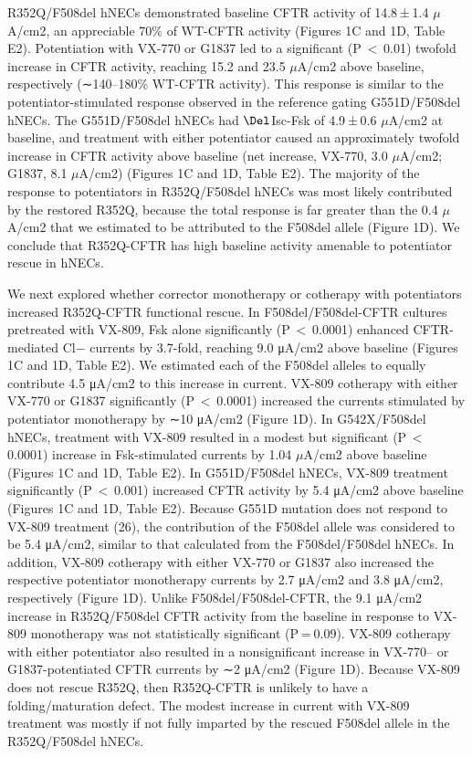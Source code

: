 R352Q/F508del hNECs demonstrated baseline CFTR activity of 14.8 ± 1.4 $\mu$A/cm2, an appreciable 70\% of WT-CFTR activity (Figures 1C and 1D, Table E2). Potentiation with VX-770 or G1837 led to a significant (P $<$ 0.01) twofold increase in CFTR activity, reaching 15.2 and 23.5 $\mu$A/cm2 above baseline, respectively (∼140–180\% WT-CFTR activity). This response is similar to the potentiator-stimulated response observed in the reference gating G551D/F508del hNECs. The G551D/F508del hNECs had $\Del$Isc-Fsk of 4.9 ± 0.6 $\mu$A/cm2 at baseline, and treatment with either potentiator caused an approximately twofold increase in CFTR activity above baseline (net increase, VX-770, 3.0 $\mu$A/cm2; G1837, 8.1 $\mu$A/cm2) (Figures 1C and 1D, Table E2). The majority of the response to potentiators in R352Q/F508del hNECs was most likely contributed by the restored R352Q, because the total response is far greater than the 0.4 $\mu$A/cm2 that we estimated to be attributed to the F508del allele (Figure 1D). We conclude that R352Q-CFTR has high baseline activity amenable to potentiator rescue in hNECs.

We next explored whether corrector monotherapy or cotherapy with potentiators increased R352Q-CFTR functional rescue. In F508del/F508del-CFTR cultures pretreated with VX-809, Fsk alone significantly (P $<$ 0.0001) enhanced CFTR-mediated Cl− currents by 3.7-fold, reaching 9.0 μA/cm2 above baseline (Figures 1C and 1D, Table E2). We estimated each of the F508del alleles to equally contribute 4.5 μA/cm2 to this increase in current. VX-809 cotherapy with either VX-770 or G1837 significantly (P $<$ 0.0001) increased the currents stimulated by potentiator monotherapy by ∼10 μA/cm2 (Figure 1D). In G542X/F508del hNECs, treatment with VX-809 resulted in a modest but significant (P $<$ 0.0001) increase in Fsk-stimulated currents by 1.04 $\mu$A/cm2 above baseline (Figures 1C and 1D, Table E2). In G551D/F508del hNECs, VX-809 treatment significantly (P $<$ 0.001) increased CFTR activity by 5.4 μA/cm2 above baseline (Figures 1C and 1D, Table E2). Because G551D mutation does not respond to VX-809 treatment (26), the contribution of the F508del allele was considered to be 5.4 μA/cm2, similar to that calculated from the F508del/F508del hNECs. In addition, VX-809 cotherapy with either VX-770 or G1837 also increased the respective potentiator monotherapy currents by 2.7 μA/cm2 and 3.8 μA/cm2, respectively (Figure 1D). Unlike F508del/F508del-CFTR, the 9.1 μA/cm2 increase in R352Q/F508del CFTR activity from the baseline in response to VX-809 monotherapy was not statistically significant (P = 0.09). VX-809 cotherapy with either potentiator also resulted in a nonsignificant increase in VX-770– or G1837-potentiated CFTR currents by ∼2 μA/cm2 (Figure 1D). Because VX-809 does not rescue R352Q, then R352Q-CFTR is unlikely to have a folding/maturation defect. The modest increase in current with VX-809 treatment was mostly if not fully imparted by the rescued F508del allele in the R352Q/F508del hNECs.

